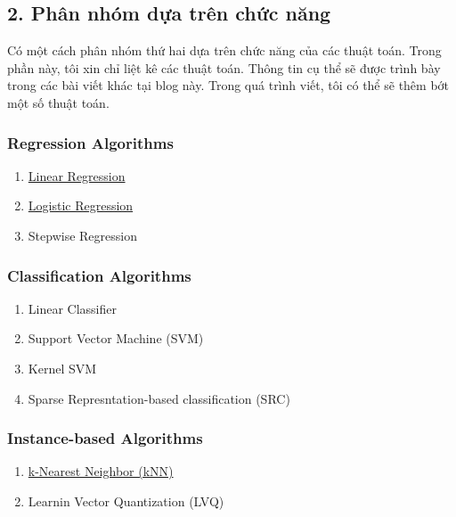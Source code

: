 \subsection{2. Phân nhóm dựa trên chức
năng}\label{phuxe2n-nhuxf3m-dux1ef1a-truxean-chux1ee9c-nux103ng}

Có một cách phân nhóm thứ hai dựa trên chức năng của các thuật toán.
Trong phần này, tôi xin chỉ liệt kê các thuật toán. Thông tin cụ thể sẽ
được trình bày trong các bài viết khác tại blog này. Trong quá trình
viết, tôi có thể sẽ thêm bớt một số thuật toán.

\hypertarget{regression-algorithms}{\subsubsection{Regression
Algorithms}\label{regression-algorithms}}

\begin{enumerate}
\def\labelenumi{\arabic{enumi}.}
\tightlist
\item
  \href{/2016/12/28/linearregression/}{Linear Regression}
\item
  \href{/2017/01/27/logisticregression/\#sigmoid-function}{Logistic
  Regression}
\item
  Stepwise Regression
\end{enumerate}

\hypertarget{classification-algorithms}{\subsubsection{Classification
Algorithms}\label{classification-algorithms}}

\begin{enumerate}
\def\labelenumi{\arabic{enumi}.}
\tightlist
\item
  Linear Classifier
\item
  Support Vector Machine (SVM)
\item
  Kernel SVM
\item
  Sparse Represntation-based classification (SRC)
\end{enumerate}

\hypertarget{instance-based-algorithms}{\subsubsection{Instance-based
Algorithms}\label{instance-based-algorithms}}

\begin{enumerate}
\def\labelenumi{\arabic{enumi}.}
\tightlist
\item
  \href{/2017/01/08/knn/}{k-Nearest Neighbor (kNN)}
\item
  Learnin Vector Quantization (LVQ)
\end{enumerate}

